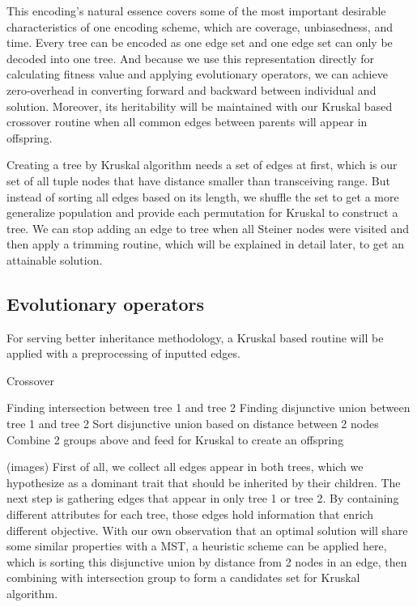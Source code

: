 This encoding’s natural essence covers some of the most important desirable characteristics of one encoding scheme, which are coverage, unbiasedness, and time. Every tree can be encoded as one edge set and one edge set can only be decoded into one tree. And because we use this representation directly for calculating fitness value and applying evolutionary operators, we can achieve zero-overhead in converting forward and backward between individual and solution. Moreover, its heritability will be maintained with our Kruskal based crossover routine when all common edges between parents will appear in offspring.

Creating a tree by Kruskal algorithm needs a set of edges at first, which is our set of all tuple nodes that have distance smaller than transceiving range. But instead of sorting all edges based on its length, we shuffle the set to get a more generalize population and provide each permutation for Kruskal to construct a tree. We can stop adding an edge to tree when all Steiner nodes were visited and then apply a trimming routine, which will be explained in detail later, to get an attainable solution.

\subsection{Evolutionary operators}
For serving better inheritance methodology, a Kruskal based routine will be applied with a preprocessing of inputted edges.

\begin{algorithm}
\caption{Crossover}
\begin{algorithmic}[1]
\State Finding intersection between tree 1 and tree 2
\State Finding disjunctive union between tree 1 and tree 2
\State Sort disjunctive union based on distance between 2 nodes
\State Combine 2 groups above and feed for Kruskal to create an offspring
\end{algorithmic}
\end{algorithm}

(images)
First of all, we collect all edges appear in both trees, which we hypothesize as a dominant trait that should be inherited by their children. The next step is gathering edges that appear in only tree 1 or tree 2. By containing different attributes for each tree, those edges hold information that enrich different objective. With our own observation that an optimal solution will share some similar properties with a MST, a heuristic scheme can be applied here, which is sorting this disjunctive union by distance from 2 nodes in an edge, then combining with intersection group to form a candidates set for Kruskal algorithm.

